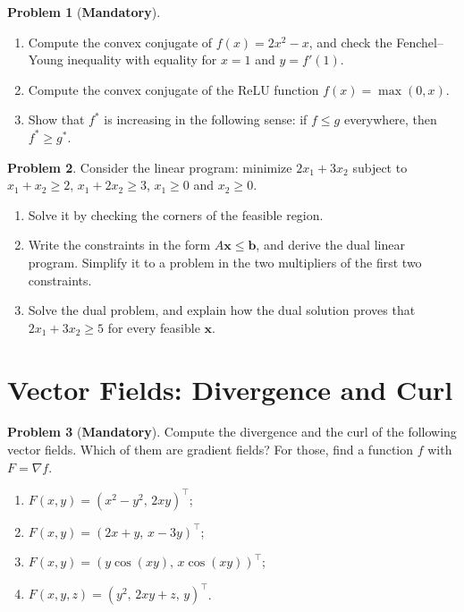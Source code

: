 \documentclass[11pt]{article}
\theoremstyle{definition}
\newtheorem{problem}{Problem}[section]
\newcommand{\mandatory}{\textcolor{red!70!black}{\textbf{Mandatory}}}
\begin{document}
\begin{problem}[\mandatory]\label{pr:conjugate}
    \begin{enumerate}[label=(\alph*)]
        \item Compute the convex conjugate of $f(x) = 2x^2 - x$, and check the Fenchel--Young inequality with equality for $x = 1$ and $y = f'(1)$.
        \item Compute the convex conjugate of the ReLU function $f(x) = \max(0, x)$.
        \item Show that $f^*$ is increasing in the following sense: if $f \leq g$ everywhere, then $f^* \geq g^*$.
    \end{enumerate}
\end{problem}

\begin{problem}\label{pr:lp-dual}
    Consider the linear program: minimize $2x_1 + 3x_2$ subject to $x_1 + x_2 \geq 2$, $x_1 + 2x_2 \geq 3$, $x_1 \geq 0$ and $x_2 \geq 0$.
    \begin{enumerate}[label=(\alph*)]
        \item Solve it by checking the corners of the feasible region.
        \item Write the constraints in the form $A\mathbf{x} \leq \mathbf{b}$, and derive the dual linear program. Simplify it to a problem in the two multipliers of the first two constraints.
        \item Solve the dual problem, and explain how the dual solution proves that $2x_1 + 3x_2 \geq 5$ for every feasible $\mathbf{x}$.
    \end{enumerate}
\end{problem}

\section{Vector Fields: Divergence and Curl}

\begin{problem}[\mandatory]\label{pr:div-curl}
    Compute the divergence and the curl of the following vector fields. Which of them are gradient fields? For those, find a function $f$ with $F = \nabla f$.
    \begin{enumerate}[label=(\alph*)]
        \item $F(x, y) = (x^2 - y^2, \, 2xy)^\top$;
        \item $F(x, y) = (2x + y, \, x - 3y)^\top$;
        \item $F(x, y) = (y\cos(xy), \, x\cos(xy))^\top$;
        \item $F(x, y, z) = (y^2, \, 2xy + z, \, y)^\top$.
    \end{enumerate}
\end{problem}
\end{document}

